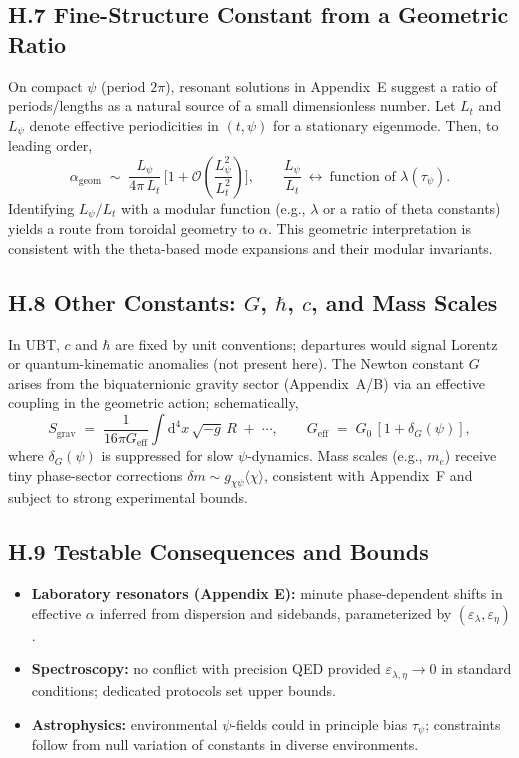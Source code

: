 \subsection*{H.7 Fine-Structure Constant from a Geometric Ratio}
On compact $\psi$ (period $2\pi$), resonant solutions in Appendix~E suggest a ratio of periods/lengths as a natural source of a small dimensionless number. 
Let $L_t$ and $L_\psi$ denote effective periodicities in $(t,\psi)$ for a stationary eigenmode. Then, to leading order,
\begin{equation}
\alpha_{\mathrm{geom}} \;\sim\; \frac{L_\psi}{4\pi\,L_t}\,\Bigg[ 1 + \mathcal{O}\!\left(\frac{L_\psi^2}{L_t^2}\right)\Bigg], 
\qquad \frac{L_\psi}{L_t}\ \longleftrightarrow\ \text{function of } \lambda(\tau_\psi).
\end{equation}
Identifying $L_\psi/L_t$ with a modular function (e.g., $\lambda$ or a ratio of theta constants) yields a route from toroidal geometry to $\alpha$.
This geometric interpretation is consistent with the theta-based mode expansions and their modular invariants.

\subsection*{H.8 Other Constants: $G$, $\hbar$, $c$, and Mass Scales}
In UBT, $c$ and $\hbar$ are fixed by unit conventions; departures would signal Lorentz or quantum-kinematic anomalies (not present here).
The Newton constant $G$ arises from the biquaternionic gravity sector (Appendix~A/B) via an effective coupling in the geometric action; schematically,
\begin{equation}
S_{\mathrm{grav}} \;=\; \frac{1}{16\pi G_{\mathrm{eff}}}\!\int\! \mathrm{d}^4x\,\sqrt{-g}\, R \;+\; \cdots,\qquad 
G_{\mathrm{eff}} \;=\; G_0 \,[1+\delta_G(\psi)],
\end{equation}
where $\delta_G(\psi)$ is suppressed for slow $\psi$-dynamics.
Mass scales (e.g., $m_e$) receive tiny phase-sector corrections $\delta m \sim g_{\chi\psi}\langle \chi\rangle$, consistent with Appendix~F and subject to strong experimental bounds.

\subsection*{H.9 Testable Consequences and Bounds}
\begin{itemize}
\item \textbf{Laboratory resonators (Appendix E):} minute phase-dependent shifts in effective $\alpha$ inferred from dispersion and sidebands, parameterized by $(\varepsilon_\lambda,\varepsilon_\eta)$.
\item \textbf{Spectroscopy:} no conflict with precision QED provided $\varepsilon_{\lambda,\eta}\!\to\!0$ in standard conditions; dedicated protocols set upper bounds.
\item \textbf{Astrophysics:} environmental $\psi$-fields could in principle bias $\tau_\psi$; constraints follow from null variation of constants in diverse environments.
\end{itemize}


